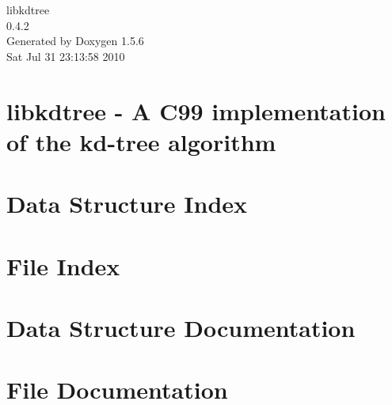 \documentclass[a4paper]{article}
\begin{document}
\begin{titlepage}
\vspace*{7cm}
\begin{center}
{\Large libkdtree \\[1ex]\large 0.4.2 }\\
\vspace*{1cm}
{\large Generated by Doxygen 1.5.6}\\
\vspace*{0.5cm}
{\small Sat Jul 31 23:13:58 2010}\\
\end{center}
\end{titlepage}
\tableofcontents
{}
\section{libkdtree - A C99 implementation of the kd-tree algorithm}
\label{index}\hypertarget{index}{}
\section{Data Structure Index}

\section{File Index}

\section{Data Structure Documentation}




\section{File Documentation}







\printindex
\end{document}
